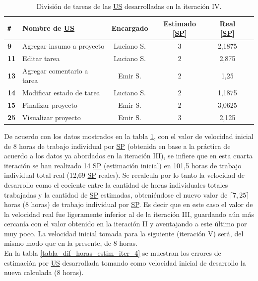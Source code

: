 \documentclass[a4paper, 12pt,twoside]{report}  %
\numberwithin{equation}{subsection} %
\begin{document}
\begin{table}[h!]
	\centering
	\begin{tabular}{ |p{0.5cm}|p{6cm}|c|c|c|c| }
		\hline
		\verb|#|& \textbf{Nombre de \hyperlink{US}{US}}& \textbf{Encargado} & \textbf{Estimado [\hyperlink{SP}{SP}]} & \textbf{Real [\hyperlink{SP}{SP}]} \\
		\hline
		\textbf{9} & Agregar insumo a proyecto & \cellcolor{marca_US_luciano}Luciano S. & 3 & 2,1875 \\
		\hline
		\textbf{11} & Editar tarea & \cellcolor{marca_US_luciano}Luciano S. & 2 & 2,875 \\
		\hline
		\textbf{13} & Agregar comentario a tarea & \cellcolor{marca_US_emir}Emir S. & 2 & 1,25 \\
		\hline
		\textbf{14} & Modificar estado de tarea & \cellcolor{marca_US_luciano}Luciano S. & 2 & 1,1875 \\
		\hline
		\textbf{15} & Finalizar proyecto & \cellcolor{marca_US_emir}Emir S. & 2 & 3,0625 \\
		\hline
		\textbf{25} & Visualizar proyecto & \cellcolor{marca_US_emir}Emir S. & 3 & 2,125 \\
		\hline
	\end{tabular}
	\caption{División de tareas de las \protect\hyperlink{US}{US} desarrolladas en la iteración IV.}
	\label{tabla_desarrollo_iter_4}
\end{table}

De acuerdo con los datos mostrados en la tabla \ref{tabla_desarrollo_iter_4}, con el valor de velocidad inicial de 8 horas de trabajo individual por \hyperlink{SP}{SP} (obtenida en base a la práctica de acuerdo a los datos ya abordados en la iteración III), se infiere que en esta cuarta iteración se han realizado 14 \hyperlink{SP}{SP} (estimación inicial) en 101,5 horas de trabajo individual total real (12,69 \hyperlink{SP}{SP} reales). Se recalcula por lo tanto la velocidad de desarrollo como el cociente entre la cantidad de horas individuales totales trabajadas y la cantidad de \hyperlink{SP}{SP} estimadas, obteniéndose el nuevo valor de \begin{math}\lceil 7,25\rceil\end{math} horas (8 horas) de trabajo individual por \hyperlink{SP}{SP}. Es decir que en este caso el valor de la velocidad real fue ligeramente inferior al de la iteración III, guardando aún más cercanía con el valor obtenido en la iteración II y aventajando a este último por muy poco. La velocidad inicial tomada para la siguiente (iteración V) será, del mismo modo que en la presente, de 8 horas.\\
\indent En la tabla \ref{tabla_dif_horas_estim_iter_4} se muestran los errores de estimación por \hyperlink{US}{US} desarrollada tomando como velocidad inicial de desarrollo la nueva calculada (8 horas).
\end{document}
